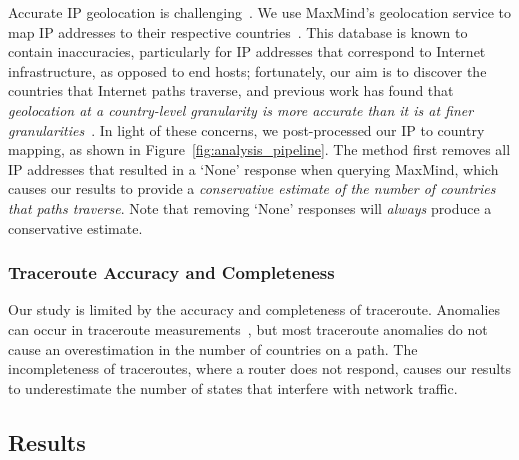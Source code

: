 Accurate IP geolocation is challenging~\cite{poese2011ip,katz2006towards,eriksson2010learning,gill2010dude,hu2012towards,guo2009mining,eriksson2012posit}. We use MaxMind's
geolocation service to map IP addresses to their respective
countries~\cite{maxmind}. This database is known to contain inaccuracies,
particularly for IP addresses that correspond to Internet infrastructure, as opposed
to end hosts; fortunately, our aim is to discover the countries that Internet paths
traverse, and previous work has found that
{\em geolocation at a country-level granularity is more accurate than it is at
finer granularities}~\cite{huffaker2011geocompare}.  
In light of these
concerns, we post-processed our IP to country mapping, as shown in Figure~\ref{fig:analysis_pipeline}.
The method first removes all IP addresses that resulted in a `None' response when
querying MaxMind, which causes our results to provide a {\em conservative
estimate of the number of countries that paths traverse}. 
Note that removing `None' responses will \textit{always} produce a
conservative estimate.

\subsubsection{Traceroute Accuracy and Completeness}
Our study is limited by the accuracy and completeness of traceroute.
Anomalies can occur in traceroute
measurements~\cite{augustin2006avoiding}, but most traceroute anomalies
do not cause an overestimation in the number of countries on a path.  The
incompleteness of traceroutes, where a router does not respond, causes
our results to underestimate the number of states that interfere with network 
traffic.


\subsection{Results}

